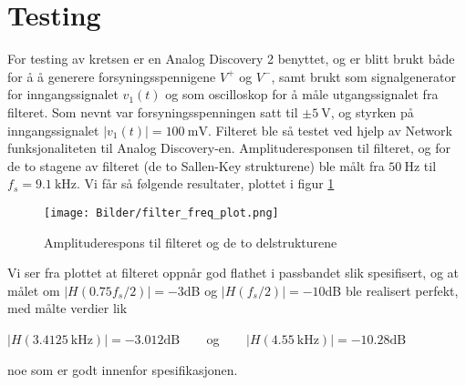 \section{Testing}
\label{testing}

For testing av kretsen er en Analog Discovery 2 benyttet, og er blitt brukt både for å å generere forsyningsspennigene $V^+$ og $V^-$, samt brukt som signalgenerator for inngangssignalet $v_1(t)$ og som oscilloskop for å måle utgangssignalet fra filteret.
Som nevnt var forsyningsspenningen satt til $\pm \SI{5}{\volt}$, og styrken på inngangssignalet $|v_1(t)| = \SI{100}{\milli\volt}$. Filteret ble så testet ved hjelp av Network funksjonaliteten til Analog Discovery-en. Amplituderesponsen til filteret, og for de to 
stagene av filteret (de to Sallen-Key strukturene) ble målt fra $\SI{50}{\hertz}$ til $f_s = \SI{9.1}{\kilo\hertz}$. Vi får så følgende resultater, plottet i figur \ref{fig:filter-freq-plot}

\begin{figure}[H]
    \centering
    \texttt{[image: Bilder/filter\_freq\_plot.png]}
    \caption{Amplituderespons til filteret og de to delstrukturene}
    \label{fig:filter-freq-plot}
\end{figure}

Vi ser fra plottet at filteret oppnår god flathet i passbandet slik spesifisert, og at målet om $|H(0.75 f_s / 2)| = -3$dB og $|H(f_s/2)| = -10$dB ble realisert perfekt, med målte verdier lik
\begin{center}
    $|H(\SI{3.4125}{\kilo\hertz})| = -3.012\text{dB}\:\:\:\:\:\:\:\:$ og $\:\:\:\:\:\:\:\:|H(\SI{4.55}{\kilo\hertz})| = -10.28\text{dB}$
\end{center}
noe som er godt innenfor spesifikasjonen.
